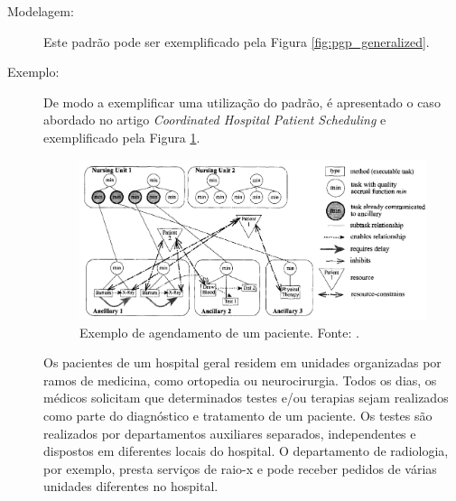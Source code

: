 \begin{description}
\item[Modelagem:] Este padrão pode ser exemplificado pela Figura \ref{fig:pgp_generalized}. 
    
\item[Exemplo:] 

De modo a exemplificar uma utilização do padrão, é apresentado o caso abordado no artigo \textit{Coordinated Hospital Patient Scheduling} \cite{decker1998coordinated} e exemplificado pela Figura \ref{fig:gpgp_hospital_example}.




\begin{figure}[h!]
    \centering
    \includegraphics[scale=0.42]{figuras/pgp/gpgp_hospital_example.png}
    \caption{Exemplo de agendamento de um paciente. Fonte: .}
    \label{fig:gpgp_hospital_example}
\end{figure}


Os pacientes de um hospital geral residem em unidades organizadas por ramos de medicina, como ortopedia ou neurocirurgia. Todos os dias, os médicos solicitam que determinados testes e/ou terapias sejam realizados como parte do diagnóstico e tratamento de um paciente. Os testes são realizados por departamentos auxiliares separados, independentes e dispostos em diferentes locais do hospital. O departamento de radiologia, por exemplo, presta serviços de raio-x e pode receber pedidos de várias unidades diferentes no hospital.


\end{description}
